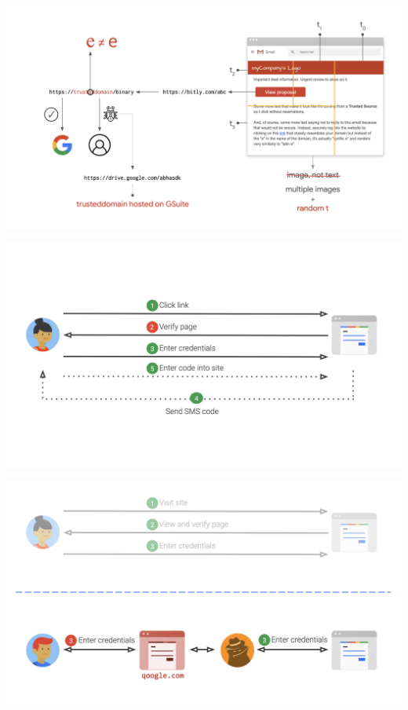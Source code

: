 \documentclass[nobackground,dvipsnames,table]{beamer}
\begin{document}
\begin{frame}{}
\end{frame}

\begin{frame}{}%
    \thispagestyle{empty}
    \includegraphics[width=\paperwidth]{anatomy-of-phishing-mail}
\end{frame}

\begin{frame}{}%
    \thispagestyle{empty}
    \includegraphics[width=\paperwidth]{login-diagram}
\end{frame}

\begin{frame}{}%
    \thispagestyle{empty}
    \includegraphics[width=\paperwidth]{login-diagram-phishing}
\end{frame}
\end{document}
